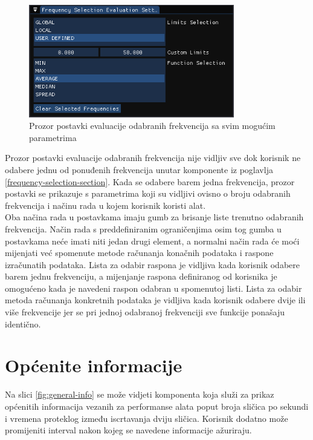 \documentclass[times, utf8, diplomski]{fer}
\begin{document}
\begin{figure} [H]
	\centering
    \includegraphics[width=0.8\textwidth]{frq_sel_eval_settings.png}
    \caption{Prozor postavki evaluacije odabranih frekvencija sa svim mogućim parametrima}
    \label{fig:frq-sel-eval-settings}
\end{figure}

Prozor postavki evaluacije odabranih frekvencija nije vidljiv sve dok korisnik ne odabere jednu od ponuđenih frekvencija unutar komponente iz poglavlja \ref{frequency-selection-section}. Kada se odabere barem jedna frekvencija, prozor postavki se prikazuje s parametrima koji su vidljivi ovisno o broju odabranih frekvencija i načinu rada u kojem korisnik koristi alat.\\

Oba načina rada u postavkama imaju gumb za brisanje liste trenutno odabranih frekvencija. Način rada s preddefiniranim ograničenjima osim tog gumba u postavkama neće imati niti jedan drugi element, a normalni način rada će moći mijenjati već spomenute metode računanja konačnih podataka i raspone izračunatih podataka. Lista za odabir raspona je vidljiva kada korisnik odabere barem jednu frekvenciju, a mijenjanje raspona definiranog od korisnika je omogućeno kada je navedeni raspon odabran u spomenutoj listi. Lista za odabir metoda računanja konkretnih podataka je vidljiva kada korisnik odabere dvije ili više frekvencije jer se pri jednoj odabranoj frekvenciji sve funkcije ponašaju identično.


\section{Općenite informacije} \label{general-info-section}

Na slici \ref{fig:general-info} se može vidjeti komponenta koja služi za prikaz općenitih informacija vezanih za performanse alata poput broja sličica po sekundi i vremena proteklog između iscrtavanja dviju sličica. Korisnik dodatno može promijeniti interval nakon kojeg se navedene informacije ažuriraju.
\end{document}
